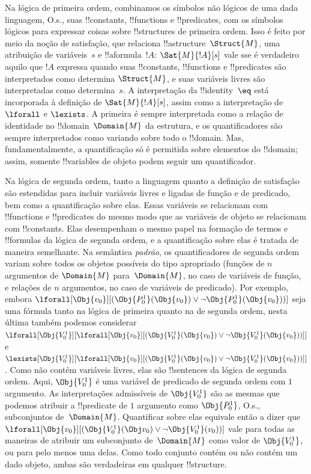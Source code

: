 \documentclass[../../../include/open-logic-section]{subfiles}
\begin{document}


Na lógica de primeira ordem, combinamos os símbolos não lógicos de uma dada
linguagem, O.s.\@, suas !!{constant}s, !!{function}s e !!{predicate}s, com
os símbolos lógicos para expressar coisas sobre !!{structure}s de primeira
ordem. Isso é feito por meio da noção de satisfação, que relaciona
!!a{structure}~$\Struct{M}$, uma atribuição de variáveis~$s$ e
!!a{formula}~$!A$: $\Sat{M}{!A}[s]$ vale sse é verdadeiro aquilo que $!A$
expressa quando suas !!{constant}s, !!{function}s e !!{predicate}s são
interpretados como determina $\Struct{M}$, e suas variáveis livres são
interpretadas como determina~$s$. A interpretação da !!{identity}~$\eq$
está incorporada à definição de $\Sat{M}{!A}[s]$, assim como a interpretação
de~$\lforall$ e $\lexists$. A primeira é sempre interpretada como a relação
de identidade no !!{domain}~$\Domain{M}$ da estrutura, e os quantificadores
são sempre interpretados como variando sobre todo o !!{domain}. Mas,
fundamentalmente, a quantificação só é permitida sobre elementos do
!!{domain}; assim, somente !!{variable}s de objeto podem seguir um
quantificador.

Na lógica de segunda ordem, tanto a linguagem quanto a definição de
satisfação são estendidas para incluir variáveis livres e ligadas de função
e de predicado, bem como a quantificação sobre elas. Essas variáveis se
relacionam com !!{function}s e !!{predicate}s do mesmo modo que as variáveis
de objeto se relacionam com !!{constant}s. Elas desempenham o mesmo papel
na formação de termos e !!{formula}s da lógica de segunda ordem, e a
quantificação sobre elas é tratada de maneira semelhante. Na semântica
\emph{padrão}, os quantificadores de segunda ordem variam sobre todos os
objetos possíveis do tipo apropriado (funções de $n$ argumentos de
$\Domain{M}$ para~$\Domain{M}$, no caso de variáveis de função, e relações
de $n$ argumentos, no caso de variáveis de predicado). Por exemplo, embora
$\lforall[\Obj{v_0}][(\Obj{P^1_0}(\Obj{v_0}) \lor \lnot
  \Obj{P^1_0}(\Obj{v_0}))]$ seja uma fórmula tanto na lógica de primeira
quanto na de segunda ordem, nesta última também podemos considerar
$\lforall[\Obj{V^1_0}][\lforall[\Obj{v_0}][(\Obj{V^1_0}(\Obj{v_0}) \lor
    \lnot \Obj{V^1_0}(\Obj{v_0}))]]$ e
$\lexists[\Obj{V^1_0}][\lforall[\Obj{v_0}][(\Obj{V^1_0}(\Obj{v_0}) \lor
    \lnot \Obj{V^1_0}(\Obj{v_0}))]]$. Como não contêm variáveis livres,
elas são !!{sentence}s da lógica de segunda ordem. Aqui, $\Obj{V^1_0}$ é
uma variável de predicado de segunda ordem com $1$ argumento. As
interpretações admissíveis de $\Obj{V^1_0}$ são as mesmas que podemos
atribuir a !!{predicate} de $1$ argumento como $\Obj{P^1_0}$, O.s.\@,
subconjuntos de~$\Domain{M}$. Quantificar sobre elas equivale então a dizer
que $\lforall[\Obj{v_0}][(\Obj{V^1_0}(\Obj v_0) \lor \lnot
  \Obj{V^1_0}(v_0))]$ vale para todas as maneiras de atribuir um subconjunto
de~$\Domain{M}$ como valor de $\Obj{V^1_0}$, ou para pelo menos uma delas.
Como todo conjunto contém ou não contém um dado objeto, ambas são
verdadeiras em qualquer !!{structure}.
\end{document}
